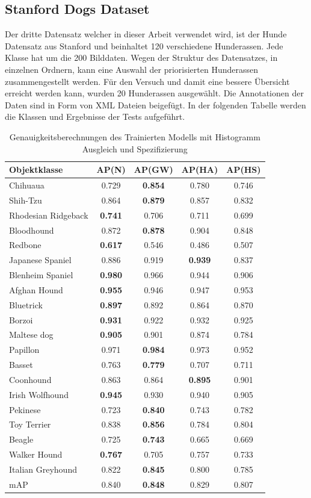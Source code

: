 \documentclass[a4paper,12pt,oneside]{article}
\begin{document}
  \subsection{Stanford Dogs Dataset}
Der dritte Datensatz welcher in dieser Arbeit verwendet wird, ist der Hunde Datensatz aus Stanford und beinhaltet 120 verschiedene Hunderassen. Jede Klasse hat um die 200 Bilddaten. Wegen der Struktur des Datensatzes, in einzelnen Ordnern, kann eine Auswahl der priorisierten Hunderassen zusammengestellt werden. Für den Versuch und damit eine bessere Übersicht erreicht werden kann, wurden 20 Hunderassen ausgewählt. Die Annotationen der Daten sind in Form von XML Dateien beigefügt. In der folgenden Tabelle werden die Klassen und Ergebnisse der Tests aufgeführt.
\begin{table}
[h]
\caption{Genauigkeitsberechnungen des Trainierten Modells mit Histogramm Ausgleich und Spezifizierung}
\centering
\begin{tabular}{|l|c|c|c|c|}
\hline
Objektklasse & AP(N) & AP(GW) & AP(HA) & AP(HS)\\
\hline
Chihuaua & 0.729 & \textbf{0.854} & 0.780 & 0.746\\ 
Shih-Tzu & 0.864 & \textbf{0.879} & 0.857 & 0.832\\
Rhodesian Ridgeback & \textbf{0.741} & 0.706 & 0.711 & 0.699\\
Bloodhound & 0.872 & \textbf{0.878} & 0.904 & 0.848\\
Redbone & \textbf{0.617} & 0.546 & 0.486 & 0.507\\ 
Japanese Spaniel & 0.886 & 0.919 & \textbf{0.939} & 0.837\\
Blenheim Spaniel & \textbf{0.980} & 0.966 & 0.944 & 0.906\\
Afghan Hound & \textbf{0.955} & 0.946 & 0.947 & 0.953\\
Bluetrick & \textbf{0.897} & 0.892 & 0.864 & 0.870\\ 
Borzoi & \textbf{0.931} & 0.922 & 0.932 & 0.925\\
Maltese dog & \textbf{0.905} & 0.901 & 0.874 & 0.784\\
Papillon & 0.971 & \textbf{0.984} & 0.973 & 0.952\\
Basset & 0.763 & \textbf{0.779} & 0.707 & 0.711\\
Coonhound & 0.863 & 0.864 & \textbf{0.895} & 0.901\\
Irish Wolfhound & \textbf{0.945} & 0.930 & 0.940 & 0.905\\
Pekinese & 0.723 & \textbf{0.840} & 0.743 & 0.782\\
Toy Terrier & 0.838 & \textbf{0.856} & 0.784 & 0.804\\
Beagle & 0.725 & \textbf{0.743} & 0.665 & 0.669\\
Walker Hound & \textbf{0.767} & 0.705 & 0.757 & 0.733\\
Italian Greyhound & 0.822 & \textbf{0.845} & 0.800 & 0.785\\
\hline
mAP & 0.840 & \textbf{0.848} & 0.829 & 0.807\\
\hline
\end{tabular}
\end{table}    
  \newpage
\end{document}
